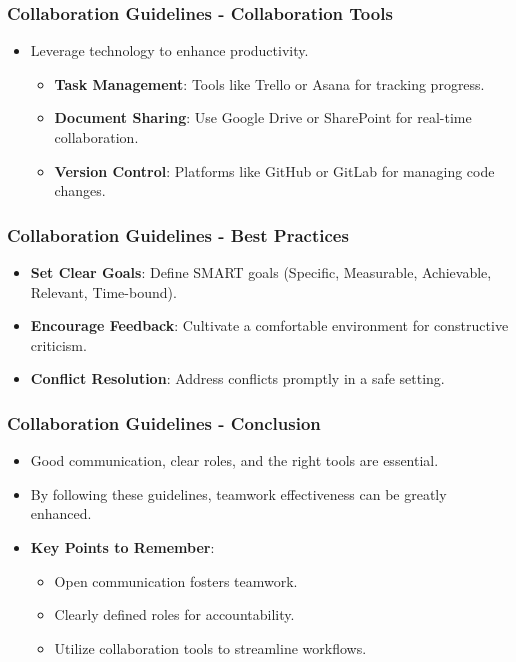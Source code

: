 \documentclass[aspectratio=169]{beamer}
\begin{document}
\begin{frame}[fragile]
    \frametitle{Collaboration Guidelines - Collaboration Tools}
    \begin{itemize}
        \item Leverage technology to enhance productivity.
        \begin{itemize}
            \item \textbf{Task Management}: Tools like Trello or Asana for tracking progress.
            \item \textbf{Document Sharing}: Use Google Drive or SharePoint for real-time collaboration.
            \item \textbf{Version Control}: Platforms like GitHub or GitLab for managing code changes.
        \end{itemize}
    \end{itemize}
\end{frame}

\begin{frame}[fragile]
    \frametitle{Collaboration Guidelines - Best Practices}
    \begin{itemize}
        \item \textbf{Set Clear Goals}: Define SMART goals (Specific, Measurable, Achievable, Relevant, Time-bound).
        \item \textbf{Encourage Feedback}: Cultivate a comfortable environment for constructive criticism.
        \item \textbf{Conflict Resolution}: Address conflicts promptly in a safe setting.
    \end{itemize}
\end{frame}

\begin{frame}[fragile]
    \frametitle{Collaboration Guidelines - Conclusion}
    \begin{itemize}
        \item Good communication, clear roles, and the right tools are essential.
        \item By following these guidelines, teamwork effectiveness can be greatly enhanced.
        \item \textbf{Key Points to Remember}:
        \begin{itemize}
            \item Open communication fosters teamwork.
            \item Clearly defined roles for accountability.
            \item Utilize collaboration tools to streamline workflows.
        \end{itemize}
    \end{itemize}
\end{frame}
\end{document}
